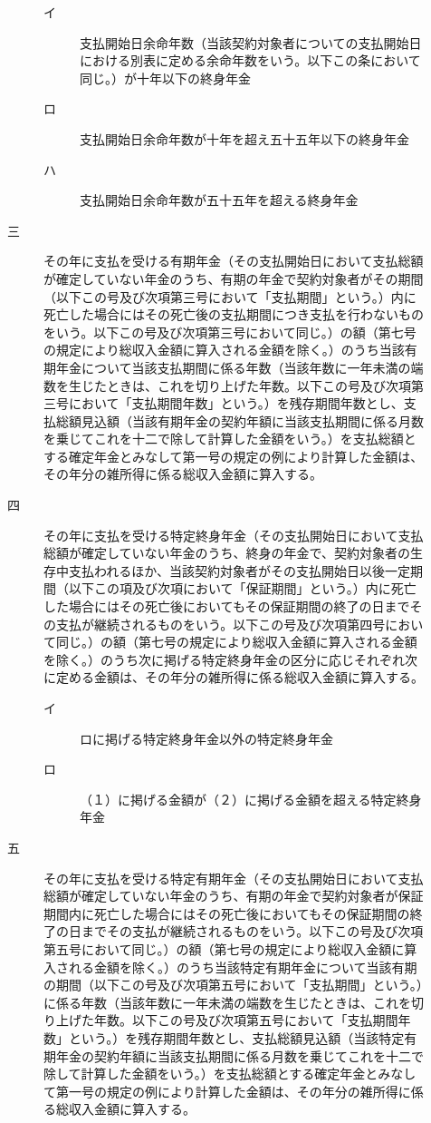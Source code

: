 \documentclass[twocolumn,a4j,10pt]{ltjtarticle}
\begin{document}
\begin{description}
\begin{description}
\begin{description}
\item[イ]支払開始日余命年数（当該契約対象者についての支払開始日における別表に定める余命年数をいう。以下この条において同じ。）が十年以下の終身年金
\item[ロ]支払開始日余命年数が十年を超え五十五年以下の終身年金
\item[ハ]支払開始日余命年数が五十五年を超える終身年金
\end{description}
\item[三]その年に支払を受ける有期年金（その支払開始日において支払総額が確定していない年金のうち、有期の年金で契約対象者がその期間（以下この号及び次項第三号において「支払期間」という。）内に死亡した場合にはその死亡後の支払期間につき支払を行わないものをいう。以下この号及び次項第三号において同じ。）の額（第七号の規定により総収入金額に算入される金額を除く。）のうち当該有期年金について当該支払期間に係る年数（当該年数に一年未満の端数を生じたときは、これを切り上げた年数。以下この号及び次項第三号において「支払期間年数」という。）を残存期間年数とし、支払総額見込額（当該有期年金の契約年額に当該支払期間に係る月数を乗じてこれを十二で除して計算した金額をいう。）を支払総額とする確定年金とみなして第一号の規定の例により計算した金額は、その年分の雑所得に係る総収入金額に算入する。
\item[四]その年に支払を受ける特定終身年金（その支払開始日において支払総額が確定していない年金のうち、終身の年金で、契約対象者の生存中支払われるほか、当該契約対象者がその支払開始日以後一定期間（以下この項及び次項において「保証期間」という。）内に死亡した場合にはその死亡後においてもその保証期間の終了の日までその支払が継続されるものをいう。以下この号及び次項第四号において同じ。）の額（第七号の規定により総収入金額に算入される金額を除く。）のうち次に掲げる特定終身年金の区分に応じそれぞれ次に定める金額は、その年分の雑所得に係る総収入金額に算入する。
\begin{description}
\item[イ]ロに掲げる特定終身年金以外の特定終身年金
\item[ロ]（１）に掲げる金額が（２）に掲げる金額を超える特定終身年金
\end{description}
\item[五]その年に支払を受ける特定有期年金（その支払開始日において支払総額が確定していない年金のうち、有期の年金で契約対象者が保証期間内に死亡した場合にはその死亡後においてもその保証期間の終了の日までその支払が継続されるものをいう。以下この号及び次項第五号において同じ。）の額（第七号の規定により総収入金額に算入される金額を除く。）のうち当該特定有期年金について当該有期の期間（以下この号及び次項第五号において「支払期間」という。）に係る年数（当該年数に一年未満の端数を生じたときは、これを切り上げた年数。以下この号及び次項第五号において「支払期間年数」という。）を残存期間年数とし、支払総額見込額（当該特定有期年金の契約年額に当該支払期間に係る月数を乗じてこれを十二で除して計算した金額をいう。）を支払総額とする確定年金とみなして第一号の規定の例により計算した金額は、その年分の雑所得に係る総収入金額に算入する。

\end{description}
\end{description}
\end{document}
